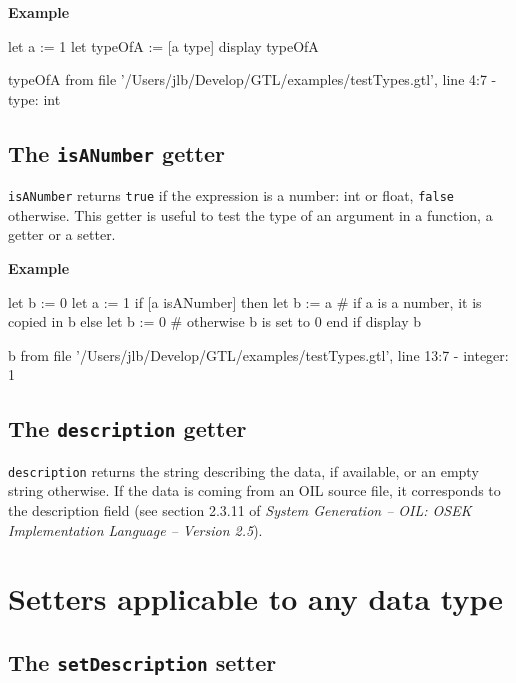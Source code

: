 \documentclass[10pt,openright,twosides]{report}
\newcommand{\gtltype}[1]{{\small\ttfamily #1}}
\newcommand{\gtlinline}[1]{\colorbox{light-blue}{\lstinline[language=gtl]{#1}}}
\newcommand{\example}{\vspace{.75em}\noindent\textbf{Example}\vspace{0em}}
\begin{document}
\example

\begin{gtl}
let a := 1
let typeOfA := [a type]
display typeOfA
\end{gtl}

\begin{console}
typeOfA from file '/Users/jlb/Develop/GTL/examples/testTypes.gtl', line 4:7
  - type: int
\end{console}

\subsection{The \texttt{isANumber} getter} 
\label{sec:isANumber}
 
\gtlinline{isANumber} returns \gtlinline{true} if the expression is a number: \gtltype{int} or \gtltype{float}, \gtlinline{false} otherwise. This getter is useful to test the type of an argument in a function, a getter or a setter.

\example

\begin{gtl}
let b := 0
let a := 1
if [a isANumber] then
  let b := a # if a is a number, it is copied in b
else
  let b := 0 # otherwise b is set to 0
end if
display b
\end{gtl}

\begin{console}
b from file '/Users/jlb/Develop/GTL/examples/testTypes.gtl', line 13:7
  - integer: 1
\end{console}


\subsection{The \texttt{description} getter} 
\label{sec:description}

\gtlinline{description} returns the string describing the data, if available, or an empty string otherwise. If the data is coming from an OIL source file, it corresponds to the description field (see section 2.3.11 of \emph{System Generation -- OIL: OSEK Implementation Language -- Version 2.5}).

\section{Setters applicable to any data type}

\subsection{The \texttt{setDescription} setter} 
\label{sec:setDescription}
\end{document}
